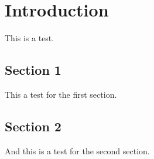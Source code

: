 \chapter[Chapter 1]{Introduction}
\label{sec:introduction}

This is a test.
\section{Section 1}
This a test for the first section.
\section{Section 2}
And this is a test for the second section.
